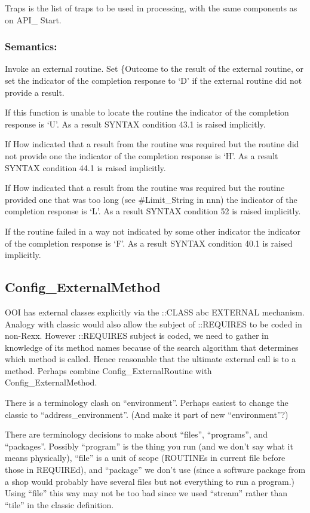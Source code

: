 Traps is the list of traps to be used in processing, with the same
components as on API\_ Start.

\subsubsection{Semantics:}\label{semantics-18}

Invoke an external routine. Set \{Outcome to the result of the external
routine, or set the indicator of the completion response to `D' if the
external routine did not provide a result.

If this function is unable to locate the routine the indicator of the
completion response is `U'. As a result SYNTAX condition 43.1 is raised
implicitly.

If How indicated that a result from the routine was required but the
routine did not provide one the indicator of the completion response is
`H'. As a result SYNTAX condition 44.1 is raised implicitly.

If How indicated that a result from the routine was required but the
routine provided one that was too long (see \#Limit\_String in nnn) the
indicator of the completion response is `L'. As a result SYNTAX
condition 52 is raised implicitly.

If the routine failed in a way not indicated by some other indicator the
indicator of the completion response is `F'. As a result SYNTAX
condition 40.1 is raised implicitly.

\subsection{Config\_ExternalMethod}\label{config_externalmethod}

OOI has external classes explicitly via the ::CLASS abc EXTERNAL
mechanism. Analogy with classic would also allow the subject of
::REQUIRES to be coded in non-Rexx. However ::REQUIRES subject is coded,
we need to gather in knowledge of its method names because of the search
algorithm that determines which method is called. Hence reasonable that
the ultimate external call is to a method. Perhaps combine
Config\_ExternalRoutine with Config\_ExternalMethod.

There is a terminology clash on ``environment''. Perhaps easiest to
change the classic to ``address\_environment''. (And make it part of new
``environment''?)

There are terminology decisions to make about ``files'', ``programs'',
and ``packages''. Possibly ``program'' is the thing you run (and we
don't say what it means physically), ``file'' is a unit of scope
(ROUTINEs in current file before those in REQUIREd), and ``package'' we
don't use (since a software package from a shop would probably have
several files but not everything to run a program.) Using ``file'' this
way may not be too bad since we used ``stream'' rather than ``tile'' in
the classic definition.

